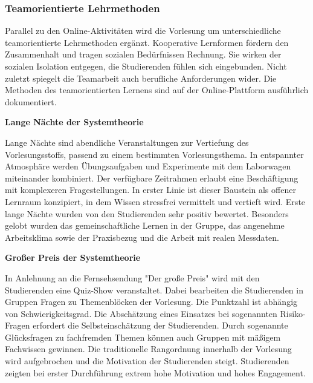 \subsubsection{Teamorientierte Lehrmethoden}

\noindent Parallel zu den Online-Aktivitäten wird die Vorlesung um unterschiedliche teamorientierte Lehrmethoden erg\"{a}nzt. Kooperative Lernformen f\"{o}rdern den Zusammenhalt und tragen sozialen Bed\"{u}rfnissen Rechnung. Sie wirken der sozialen Isolation entgegen, die Studierenden f\"{u}hlen sich eingebunden. Nicht zuletzt spiegelt die Teamarbeit auch berufliche Anforderungen wider. Die Methoden des teamorientierten Lernens sind auf der Online-Plattform ausf\"{u}hrlich dokumentiert.\bigskip

{\selectfont
\noindent\textbf{Lange Nächte der Systemtheorie}} \smallskip

\noindent Lange N\"{a}chte sind abendliche Veranstaltungen zur Vertiefung des Vorlesungsstoffs, passend zu einem bestimmten Vorlesungsthema. In entspannter Atmosph\"{a}re werden \"{U}bungsaufgaben und Experimente mit dem Laborwagen miteinander kombiniert. Der verf\"{u}gbare Zeitrahmen erlaubt eine Besch\"{a}ftigung mit komplexeren Fragestellungen. In erster Linie ist dieser Baustein als offener Lernraum konzipiert, in dem Wissen stressfrei vermittelt und vertieft wird. Erste lange N\"{a}chte wurden von den Studierenden sehr positiv bewertet. Besonders gelobt wurden das gemeinschaftliche Lernen in der Gruppe, das angenehme Arbeitsklima sowie der Praxisbezug und die Arbeit mit realen Messdaten.

\clearpage

{\selectfont
\noindent\textbf{Gro{\ss}er Preis der Systemtheorie}} \smallskip

\noindent In Anlehnung an die Fernsehsendung "Der gro{\ss}e Preis" wird mit den Studierenden eine Quiz-Show veranstaltet. Dabei bearbeiten die Studierenden in Gruppen Fragen zu Themenbl\"{o}cken der Vorlesung. Die Punktzahl ist abh\"{a}ngig von Schwierigkeitsgrad. Die Absch\"{a}tzung eines Einsatzes bei sogenannten Risiko-Fragen erfordert die Selbsteinsch\"{a}tzung der Studierenden. Durch sogenannte Gl\"{u}cksfragen zu fachfremden Themen k\"{o}nnen auch Gruppen mit m\"{a}{\ss}igem Fachwissen gewinnen. Die traditionelle Rangordnung innerhalb der Vorlesung wird aufgebrochen und die Motivation der Studierenden steigt. Studierenden zeigten bei erster Durchf\"{u}hrung extrem hohe Motivation und hohes Engagement.\bigskip

